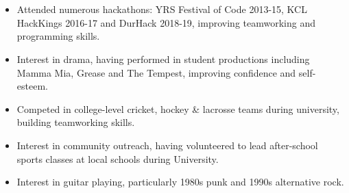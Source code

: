 \documentclass[9pt,a4paper,ragged2e,withhyper]{altacv}
\begin{document}
\begin{paracol}{2}
\medskip


\\
\\


\begin{itemize}
  \item Attended numerous hackathons: YRS Festival of Code 2013-15, KCL HackKings 2016-17 and DurHack 2018-19, improving teamworking and programming skills.
  \item Interest in drama, having performed in student productions including Mamma Mia, Grease and The Tempest, improving confidence and self-esteem.
  \item Competed in college-level cricket, hockey \& lacrosse teams during university, building teamworking skills.
  \item Interest in community outreach, having volunteered to lead after-school sports classes at local schools during University.
  \item Interest in guitar playing, particularly 1980s punk and 1990s alternative rock.
\end{itemize}


\end{paracol}
\end{document}
